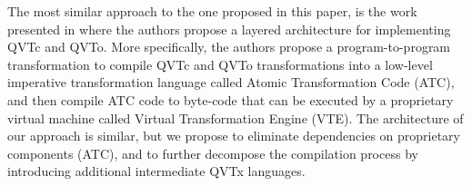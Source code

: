 The most similar approach to the one proposed in this paper, is the work presented in \cite{Sanchez-Barbudo.etal2008} where the authors propose a layered architecture for implementing QVTc and QVTo. More specifically, the authors propose a program-to-program transformation to compile QVTc and QVTo transformations into a low-level imperative transformation language called Atomic Transformation Code (ATC), and then compile ATC code to byte-code that can be executed by a proprietary virtual machine called Virtual Transformation Engine (VTE). The architecture of our approach is similar, but we propose to eliminate dependencies on proprietary components (ATC), and to further decompose the compilation process by introducing additional intermediate QVTx languages.

